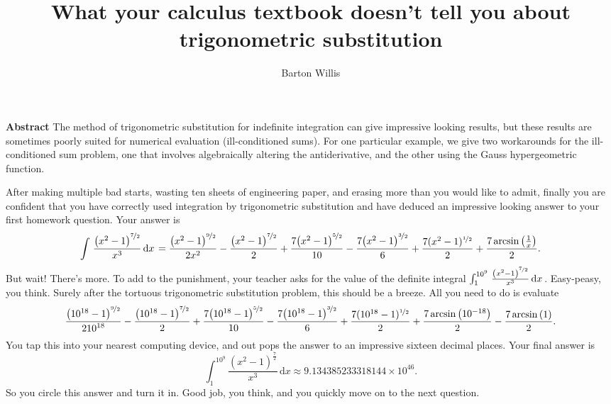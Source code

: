 \documentclass[12pt,fleqn]{article}
\title{What your calculus textbook doesn't tell you about trigonometric substitution}
\author{Barton Willis}
\begin{document}
\maketitle

\begin{shaded}
  \noindent \textbf{Abstract} The method of trigonometric substitution for indefinite
  integration can give impressive looking results, but these results 
  are sometimes poorly suited for numerical evaluation (ill-conditioned sums).  
  For one particular example, we give two workarounds for the ill-conditioned sum problem, one that involves algebraically 
  altering the antiderivative, and the other using the Gauss hypergeometric function.
\end{shaded}

After making multiple bad starts, wasting ten sheets of engineering paper, 
 and erasing more  than you would like to admit, finally you are confident 
 that you have correctly used integration by trigonometric substitution and have
 deduced an impressive looking answer to your first homework question. Your answer
 is
 \begin{equation*}
    \int {\left. \frac{{{\left( {{x}^{2}}-1\right) }^{\nicefrac{7}{2}}}}{{{x}^{3}}} \, \mathrm{d}x\right.}=\frac{{{\left( {{x}^{2}}-1\right) }^{\nicefrac{9}{2}}}}{2 {{x}^{2}}}-\frac{{{\left( {{x}^{2}}-1\right) }^{\nicefrac{7}{2}}}}{2}+\frac{7 {{\left( {{x}^{2}}-1\right) }^{\nicefrac{5}{2}}}}{10}-\frac{7 {{\left( {{x}^{2}}-1\right) }^{\nicefrac{3}{2}}}}{6}+\frac{7 (x^2-1)^{\nicefrac{1}{2}}}{2}+\frac{7 \operatorname{arcsin}\left( \frac{1}{x}\right) }{2}.
\end{equation*}
But wait! There's more. To add to the punishment, your teacher asks for the value of  
the definite integral $\int_1^{10^9} {\left. \frac{{{\left( {{x}^{2}}-1\right) }^{\nicefrac{7}{2}}}}{{{x}^{3}}} \, \mathrm{d}x\right.}$. Easy-peasy, you think.
Surely after the tortuous trigonometric substitution problem, this should be a breeze. 
All you need to do is evaluate
\begin{equation*}
  \frac{{{\left( {{10}^{18}}-1\right) }^{\nicefrac{9}{2}}}}{2 {{10}^{18}}}-\frac{{{\left( {{10}^{18}}-1\right) }^{\nicefrac{7}{2}}}}{2}+\frac{7 {{\left( {{10}^{18}}-1\right) }^{\nicefrac{5}{2}}}}{10}-\frac{7 {{\left( {{10}^{18}}-1\right) }^{\nicefrac{3}{2}}}}{6}+\frac{7 (10^{18}-1)^{\nicefrac{1}{2}}}{2}+\frac{7 \operatorname{arcsin}\left( 10^{-18}\right) }{2}
    - \frac{7 \operatorname{arcsin}\left( 1 \right) }{2}.
\end{equation*}
You tap this into your nearest computing device, and out  pops the answer to an 
impressive sixteen decimal places. Your final answer is
\begin{equation*}
    \int_1^{10^9} {\left. \frac{{{\left( {{x}^{2}}-1\right) }^{\frac{7}{2}}}}{{{x}^{3}}} \, \mathrm{d}x\right.}
       \approx 9.134385233318144 \times {{10}^{46}}.
\end{equation*}
So you circle this answer and turn it in. Good job, you think, and you
quickly move on to the next question.
\end{document}
